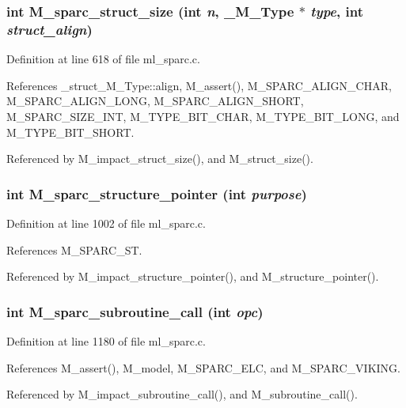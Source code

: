 \subsubsection{\setlength{\rightskip}{0pt plus 5cm}int M\_\-sparc\_\-struct\_\-size (int {\em n}, \bf{\_\-M\_\-Type} $\ast$ {\em type}, int {\em struct\_\-align})}\label{ml__sparc_8c_62f8aebcd3384c1c9136d36790ce4352}




Definition at line 618 of file ml\_\-sparc.c.

References \_\-struct\_\-M\_\-Type::align, M\_\-assert(), M\_\-SPARC\_\-ALIGN\_\-CHAR, M\_\-SPARC\_\-ALIGN\_\-LONG, M\_\-SPARC\_\-ALIGN\_\-SHORT, M\_\-SPARC\_\-SIZE\_\-INT, M\_\-TYPE\_\-BIT\_\-CHAR, M\_\-TYPE\_\-BIT\_\-LONG, and M\_\-TYPE\_\-BIT\_\-SHORT.

Referenced by M\_\-impact\_\-struct\_\-size(), and M\_\-struct\_\-size().
\subsubsection{\setlength{\rightskip}{0pt plus 5cm}int M\_\-sparc\_\-structure\_\-pointer (int {\em purpose})}\label{ml__sparc_8c_625b80affb153f5aede9829e5ca16d90}




Definition at line 1002 of file ml\_\-sparc.c.

References M\_\-SPARC\_\-ST.

Referenced by M\_\-impact\_\-structure\_\-pointer(), and M\_\-structure\_\-pointer().
\subsubsection{\setlength{\rightskip}{0pt plus 5cm}int M\_\-sparc\_\-subroutine\_\-call (int {\em opc})}\label{ml__sparc_8c_e82936ab4c7f9d11dd04189341ae5a42}




Definition at line 1180 of file ml\_\-sparc.c.

References M\_\-assert(), M\_\-model, M\_\-SPARC\_\-ELC, and M\_\-SPARC\_\-VIKING.

Referenced by M\_\-impact\_\-subroutine\_\-call(), and M\_\-subroutine\_\-call().

